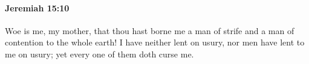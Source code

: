 
		\paragraph{Jeremiah 15:10} %
			\label{JEREMIAH-15-10}

			Woe is me, my mother, that thou hast borne me a man of strife and a man of contention to the whole earth! I have neither lent on usury, nor men have lent to me on usury; yet every one of them doth curse me.


